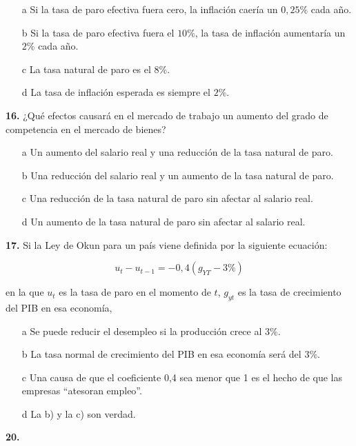\documentclass{nuevotema}
\begin{document}
\begin{itemize}
	\item[a] Si la tasa de paro efectiva fuera cero, la inflación caería un $0,25\%$ cada año.
	\item[b] Si la tasa de paro efectiva fuera el $10\%$, la tasa de inflación aumentaría un $2\%$ cada año.
	\item[c] La tasa natural de paro es el $8\%$.
	\item[d] La tasa de inflación esperada es siempre el $2\%$.
\end{itemize}

\textbf{16.} ¿Qué efectos causará en el mercado de trabajo un aumento del grado de competencia en el mercado de bienes?

\begin{itemize}
	\item[a] Un aumento del salario real y una reducción de la tasa natural de paro.
	\item[b] Una reducción del salario real y un aumento de la tasa natural de paro.
	\item[c] Una reducción de la tasa natural de paro sin afectar al salario real.
	\item[d] Un aumento de la tasa natural de paro sin afectar al salario real.
\end{itemize}


\textbf{17.} Si la Ley de Okun para un país viene definida por la siguiente ecuación:

\begin{equation*}
u_t - u_{t-1} = -0,4 (g_{YT} -3 \%)
\end{equation*}

en la que $u_t$ es la tasa de paro en el momento de $t$, $g_{yt}$ es la tasa de crecimiento del PIB en esa economía,

\begin{itemize}
	\item[a] Se puede reducir el desempleo si la producción crece al 3\%.
	\item[b] La tasa normal de crecimiento del PIB en esa economía será del 3\%.
	\item[c] Una causa de que el coeficiente 0,4 sea menor que 1 es el hecho de que las empresas ``atesoran empleo''. 
	\item[d] La b) y la c) son verdad.
\end{itemize}

\textbf{20.}
\end{document}
